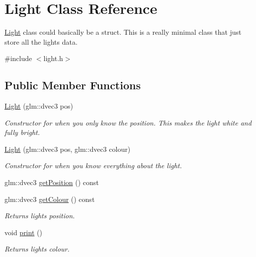 \hypertarget{class_light}{}\section{Light Class Reference}
\label{class_light}


\mbox{\hyperlink{class_light}{Light}} class could basically be a struct. This is a really minimal class that just store all the light\textquotesingle{}s data.  




{\ttfamily \#include $<$light.\+h$>$}

\subsection*{Public Member Functions}
\begin{DoxyCompactItemize}
\item 
\mbox{\hyperlink{class_light_a6f416160e79aad1966bd19bc8fa2852c}{Light}} (glm\+::dvec3 pos)
\begin{DoxyCompactList}\small\item\em Constructor for when you only know the position. This makes the light white and fully bright. \end{DoxyCompactList}\item 
\mbox{\hyperlink{class_light_a2f01af29bdae678683ee60a5ce5997ac}{Light}} (glm\+::dvec3 pos, glm\+::dvec3 colour)
\begin{DoxyCompactList}\small\item\em Constructor for when you know everything about the light. \end{DoxyCompactList}\item 
glm\+::dvec3 \mbox{\hyperlink{class_light_afef6f1ce688836058fff57357c63c276}{get\+Position}} () const
\item 
glm\+::dvec3 \mbox{\hyperlink{class_light_a0b5a8987cf73078fc2c4b9414588d51a}{get\+Colour}} () const
\begin{DoxyCompactList}\small\item\em Returns light\textquotesingle{}s position. \end{DoxyCompactList}\item 
void \mbox{\hyperlink{class_light_a99d3d45283ee007ffc8b19c0d7d27077}{print}} ()
\begin{DoxyCompactList}\small\item\em Returns light\textquotesingle{}s colour. \end{DoxyCompactList}\end{DoxyCompactItemize}


